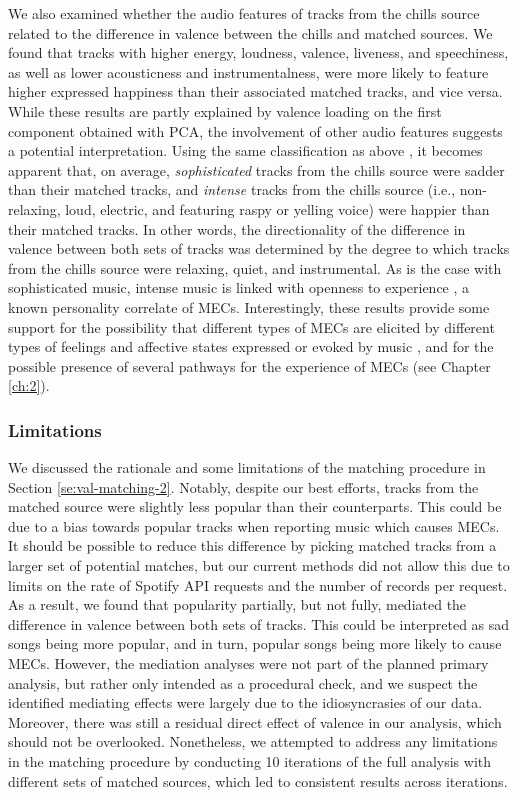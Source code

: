 We also examined whether the audio features of tracks from the chills source related to the difference in valence between the chills and matched sources. We found that tracks with higher energy, loudness, valence, liveness, and speechiness, as well as lower acousticness and instrumentalness, were more likely to feature higher expressed happiness than their associated matched tracks, and vice versa. While these results are partly explained by valence loading on the first component obtained with PCA, the involvement of other audio features suggests a potential interpretation. Using the same classification as above \parencite{rentfrow2012}, it becomes apparent that, on average, \emph{sophisticated} tracks from the chills source were sadder than their matched tracks, and \emph{intense} tracks from the chills source (i.e., non-relaxing, loud, electric, and featuring raspy or yelling voice) were happier than their matched tracks. In other words, the directionality of the difference in valence between both sets of tracks was determined by the degree to which tracks from the chills source were relaxing, quiet, and instrumental. As is the case with sophisticated music, intense music is linked with openness to experience \parencite{schafer2017}, a known personality correlate of MECs. Interestingly, these results provide some support for the possibility that different types of MECs are elicited by different types of feelings and affective states expressed or evoked by music \parencite{bannister2019, maruskin2012}, and for the possible presence of several pathways for the experience of MECs (see Chapter \ref{ch:2}).

\subsubsection{Limitations}

We discussed the rationale and some limitations of the matching procedure in Section \ref{se:val-matching-2}. Notably, despite our best efforts, tracks from the matched source were slightly less popular than their counterparts. This could be due to a bias towards popular tracks when reporting music which causes MECs. It should be possible to reduce this difference by picking matched tracks from a larger set of potential matches, but our current methods did not allow this due to limits on the rate of Spotify API requests and the number of records per request. As a result, we found that popularity partially, but not fully, mediated the difference in valence between both sets of tracks. This could be interpreted as sad songs being more popular, and in turn, popular songs being more likely to cause MECs. However, the mediation analyses were not part of the planned primary analysis, but rather only intended as a procedural check, and we suspect the identified mediating effects were largely due to the idiosyncrasies of our data. Moreover, there was still a residual direct effect of valence in our analysis, which should not be overlooked. Nonetheless, we attempted to address any limitations in the matching procedure by conducting 10 iterations of the full analysis with different sets of matched sources, which led to consistent results across iterations.

